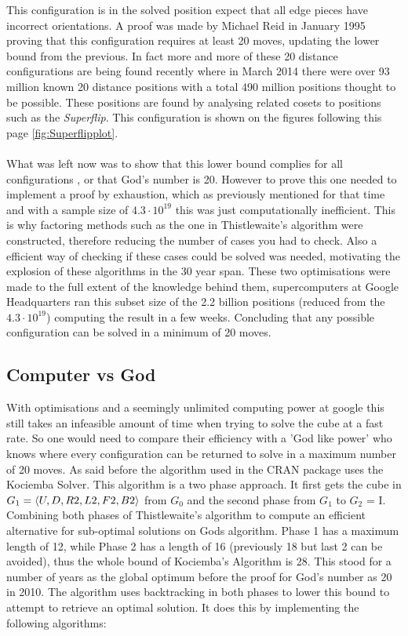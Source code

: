 \documentclass{article}
\DeclarePairedDelimiter{\opair}{\langle}{\rangle}
\newcounter{lem}[section]\setcounter{lem}{0}
\begin{document}
This configuration is in the solved position expect that all edge pieces have incorrect orientations. A proof was made by Michael Reid in January 1995 proving that this configuration requires at least 20 moves, updating the lower bound from the previous. In fact more and more of these 20 distance configurations are being found recently where in March 2014 there were over 93 million known 20 distance positions with a total 490 million positions thought to be possible. These positions are found by analysing related cosets to positions such as the \textit{Superflip}\cite{20}. This configuration is shown on the figures following this page \ref{fig:Superflipplot}.
\paragraph*{}
What was left now was to show that this lower bound complies for all configurations , or that God's number is 20\cite{God}.
However to prove this one needed to implement a proof by exhaustion, which as previously mentioned for that time and with a sample size of $4.3 \cdot 10^{19}$ this was just computationally inefficient. This is why factoring methods such as the one in Thistlewaite's algorithm were constructed, therefore reducing the number of cases you had to check. Also a efficient way of checking if these cases could be solved was needed, motivating the explosion of these algorithms in the 30 year span.
These two optimisations were made to the full extent of the knowledge behind them, supercomputers at Google Headquarters ran this subset size of the 2.2 billion positions (reduced from the $4.3\cdot 10^{19}$) computing the result in a few weeks. Concluding that any possible configuration can be solved in a minimum of 20 moves. 
\newpage
\subsection{Computer vs God}

With optimisations and a seemingly unlimited computing power at google this still takes an infeasible amount of time when trying to solve the cube at a fast rate. So one would need to compare their efficiency with a 'God like power' who knows where every configuration can be returned to solve in a maximum number of 20 moves. As said before the algorithm used in the CRAN package uses the Kociemba Solver. This algorithm is a two phase approach. It first gets the cube in  $G_1 = \opair{U,D,R2,L2,F2,B2}$ from  $G_0$ and the second phase from $G_1$ to $G_2$ = I.  Combining both phases of Thistlewaite's algorithm to compute an efficient alternative for sub-optimal solutions on Gods algorithm. Phase 1 has a maximum length of 12, while Phase 2 has a length of 16 (previously 18 but last 2 can be avoided), thus the whole bound of Kociemba's Algorithm is 28. This stood for a number of years as the global optimum before the proof for God's number as 20 in 2010\cite{Rokicki2013TheDO}. The algorithm uses backtracking in both phases to lower this bound to attempt to retrieve an optimal solution. It does this by implementing the following algorithms:
\end{document}
